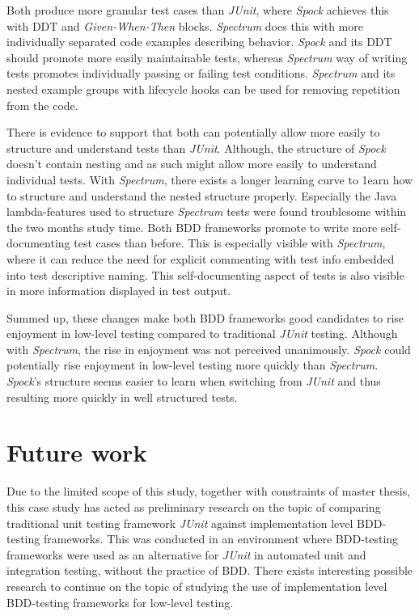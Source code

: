 Both produce more
granular test cases than \textit{JUnit}, where \textit{Spock} achieves this with DDT and \textit{Given-When-Then} blocks. \textit{Spectrum} does this with more individually separated
code examples describing behavior. \textit{Spock} and its DDT should promote more easily maintainable tests, whereas \textit{Spectrum}
way of writing tests promotes individually passing or failing test conditions. \textit{Spectrum} and
its nested example groups with lifecycle hooks can be used for removing repetition from the code.

There is evidence to support that both can potentially allow more easily to structure and understand tests than \textit{JUnit}. Although, the structure of
\textit{Spock} doesn't contain nesting and as such might allow more easily to understand individual tests.
With \textit{Spectrum}, there exists a longer learning curve to 1earn how to structure and understand the nested structure
properly. Especially the Java lambda-features used to structure \textit{Spectrum} tests were found troublesome within the two months
study time.
Both BDD frameworks
promote to write more self-documenting test cases than before. This is especially visible with \textit{Spectrum}, where it
can reduce the need for explicit commenting with test info embedded into test descriptive naming. This self-documenting
aspect of tests is also visible in more information displayed in test output.

Summed up, these changes make both BDD frameworks good candidates to rise enjoyment in low-level testing compared to traditional
\textit{JUnit} testing. Although with \textit{Spectrum}, the rise in enjoyment was not perceived unanimously. \textit{Spock} could potentially rise enjoyment in low-level
testing more quickly than \textit{Spectrum}.
\textit{Spock}'s structure seems easier to learn when switching from \textit{JUnit} and thus resulting more quickly in well structured tests.


\section{Future work}
Due to the limited scope of this study, together with constraints of master thesis, this case study has acted as preliminary
research on the topic of comparing traditional unit testing framework \textit{JUnit} against
implementation level BDD-testing frameworks. This was conducted in an environment where BDD-testing frameworks were used
as an alternative for \textit{JUnit} in automated unit and integration testing, without the practice of BDD.
There exists interesting possible research to continue
on the topic of studying the use of implementation level BDD-testing frameworks for low-level testing.

